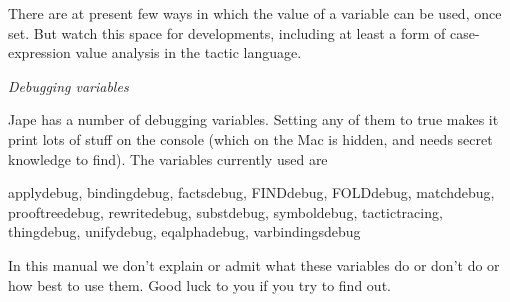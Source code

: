 There are at present few ways in which the value of a variable can be used, once set. But watch this space for developments, including at least a form of case-expression value analysis in the tactic language.


\textit{Debugging variables}


Jape has a number of debugging variables. Setting any of them to true makes it print lots of stuff on the console (which on the Mac is hidden, and needs secret knowledge to find). The variables currently used are


applydebug, bindingdebug, factsdebug, FINDdebug, FOLDdebug, matchdebug, prooftreedebug, rewritedebug, substdebug, symboldebug, tactictracing, thingdebug, unifydebug, eqalphadebug, varbindingsdebug


In this manual we don't explain or admit what these variables do or don't do or how best to use them. Good luck to you if you try to find out.
 